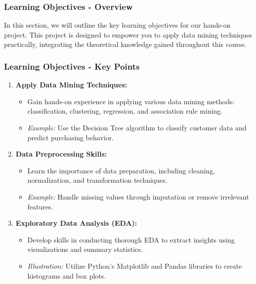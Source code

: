 \documentclass{beamer}
\begin{document}
\begin{frame}[fragile]
    \frametitle{Learning Objectives - Overview}
    In this section, we will outline the key learning objectives for our hands-on project. 
    This project is designed to empower you to apply data mining techniques practically, integrating the theoretical knowledge gained throughout this course.
\end{frame}

\begin{frame}[fragile]
    \frametitle{Learning Objectives - Key Points}
    \begin{enumerate}
        \item \textbf{Apply Data Mining Techniques:}
        \begin{itemize}
            \item Gain hands-on experience in applying various data mining methods: classification, clustering, regression, and association rule mining.
            \item \textit{Example:} Use the Decision Tree algorithm to classify customer data and predict purchasing behavior.
        \end{itemize}

        \item \textbf{Data Preprocessing Skills:}
        \begin{itemize}
            \item Learn the importance of data preparation, including cleaning, normalization, and transformation techniques.
            \item \textit{Example:} Handle missing values through imputation or remove irrelevant features.
        \end{itemize}

        \item \textbf{Exploratory Data Analysis (EDA):}
        \begin{itemize}
            \item Develop skills in conducting thorough EDA to extract insights using visualizations and summary statistics.
            \item \textit{Illustration:} Utilize Python's Matplotlib and Pandas libraries to create histograms and box plots.
        \end{itemize}
    \end{enumerate}
\end{frame}
\end{document}

